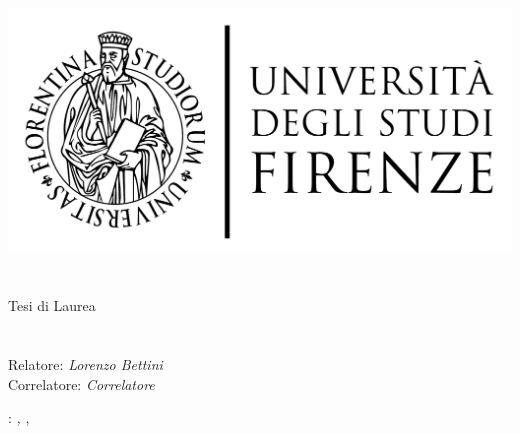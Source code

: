 \begin{titlepage}
	\begin{center}
   	\large
      \hfill
      \vfill
      \begingroup
         \includegraphics[scale=0.15]{logo/LOGO}\\
			\myFaculty \\
			\myDegree \\ 
			\vspace{0.5cm}
         \vspace{0.5cm}    
         Tesi di Laurea    
      \endgroup 
      \vfill 
      \begingroup
      	\color{Maroon}\spacedallcaps{\myItalianTitle} \\ $\ $\\
      	\spacedallcaps{\myEnglishTitle} \\ 	
	\bigskip
      \endgroup
      \spacedlowsmallcaps{\myName}
      \vfill 
      \vfill
      Relatore: \emph{Lorenzo Bettini}\\
      Correlatore: \emph{Correlatore}\\
      \vfill
      \vfill
      \myTime
      \vfill                      
	\end{center}        
\end{titlepage}   
   \newpage
	\thispagestyle{empty}
	\hfill
	\vfill
	\noindent\myName: 
	\textit{\myItalianTitle,} 
	\myDegree, \textcopyright\ \myTime
